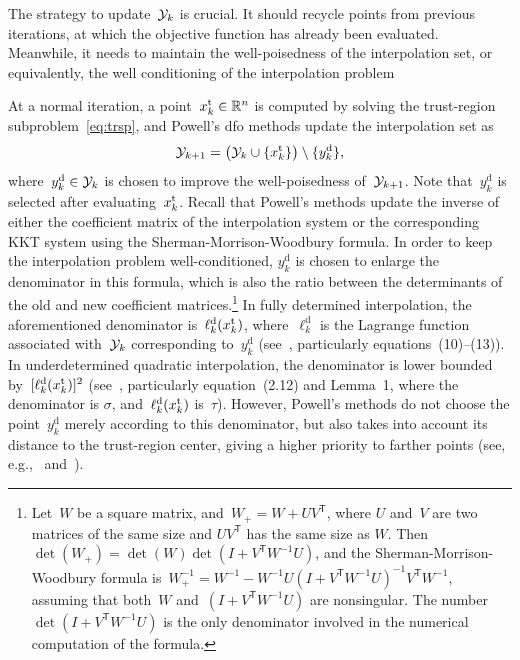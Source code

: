 \documentclass[
    smallextended,  %
    final,        %
]{svjour3}
\newcommand{\R}{\mathbb{R}}
\newcommand{\T}{\mathsf{T}}
\newcommand{\drop}{{\text{d}}}
\newcommand{\iter}[1][k]{x\ifthenelse{\equal{#1}{}}{}{_{#1}}}
\newcommand{\set}[2][]{#1\{#2#1\}}
\newcommand{\trust}{{\text{t}}}
\newcommand{\xpt}[1][k]{\mathcal{Y}\ifthenelse{\equal{#1}{}}{}{_{#1}}}
\newcommand{\kkt}{KKT\xspace}
\begin{document}
The strategy to update~$\xpt$ is crucial.
It should recycle points from previous iterations, at which the objective function has already been evaluated.
Meanwhile, it needs to maintain the well-poisedness of the interpolation set, or equivalently, the well conditioning of the interpolation problem~\cite{Sauer_Xu_1995,Conn_Scheinberg_Vicente_2009b}

At a normal iteration, a point~$\iter^{\trust} \in \R^n$ is computed by solving the trust-region
subproblem~\eqref{eq:trsp}, and Powell's \gls{dfo} methods update the interpolation set as
\begin{equation*}
    \xpt[k + 1] = \big(\xpt \cup \set{\iter^{\trust}}\big) \setminus \set{y_k^{\drop}},
\end{equation*}
where~$y_k^{\drop} \in \xpt$ is chosen to improve the well-poisedness of~$\xpt[k + 1]$.
Note that~$y_k^{\drop}$ is selected after evaluating~$\iter^{\trust}$.
Recall that Powell's methods update the inverse of either the coefficient matrix of the
interpolation system or the corresponding \kkt system using the Sherman-Morrison-Woodbury formula.
In order to keep the interpolation problem well-conditioned, $y_k^{\drop}$ is chosen
to enlarge the denominator in this formula, which is also the ratio between
the determinants of the old and new coefficient matrices.\footnote{
    Let~$W$ be a square matrix, and~$W_+ = W + UV^\T$, where $U$ and~$V$ are two
    matrices of the same size and $UV^\T$ has the same size as $W$.
    Then~$\det(W_+) = \det(W)\det(I+V^\T W^{-1}U)$, and the
    Sherman-Morrison-Woodbury formula
    is~$W_+^{-1} = W^{-1} -W^{-1}U(I+V^\T W^{-1}U)^{-1} V^\T W^{-1}$, assuming that both~$W$
    and~$(I+V^\T W^{-1}U)$ are nonsingular. The number~$\det(I+V^\T W^{-1}U)$ is the only
    denominator involved in the numerical computation of the formula.
}
In fully determined interpolation, the aforementioned denominator is~$\ell_k^\drop(\iter^{\trust})$,
where~$\ell_k^\drop$ is the Lagrange function associated with~$\xpt$ corresponding to~$y_k^\drop$
(see~\mbox{\cite[\S~2]{Powell_2001}}, particularly equations~(10)--(13)).
In underdetermined quadratic interpolation, the denominator is lower
bounded by~$[\ell_k^{\drop}(\iter^{\trust})]^2$ (see~\mbox{\cite[\S~2]{Powell_2004c}}, particularly
equation~(2.12) and Lemma~1, where the denominator is $\sigma$, and~$\ell_k^{\drop}(\iter^{\trust})$
is~$\tau$).
However, Powell's methods do not choose the point~$y_k^\drop$ merely according to this denominator, but also
takes into account its distance to the trust-region center, giving a higher priority to farther
points (see, e.g.,~\cite[equation~(56)]{Powell_2002} and~\cite[equations~(7.4)--(7.5)]{Powell_2006}).
\end{document}

